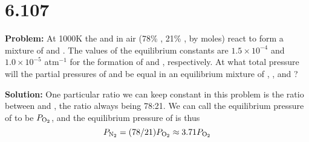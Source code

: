 \documentclass[11 pt]{article}
\newcommand{\p}[1]{
  P_{\ce{#1}}
}
\begin{document}
\section*{6.107}
\begin{problemBox}
  \textbf{Problem:} At 1000K the  and  in air (78\% , 21\% , by moles) react to form a mixture of  and .
  The values of the equilibrium constants are $1.5 \times 10^{-4}$ and $1.0 \times 10^{-5}$ atm$^{-1}$ for the formation of  and , respectively.
  At what total pressure will the partial pressures of  and  be equal in an equilibrium mixture of , ,  and ?
\end{problemBox}
\textbf{Solution:} One particular ratio we can keep constant in this problem is the ratio between  and , the ratio always being 78:21. We can call the equilibrium pressure of  to be $\p{O2}$, and the equilibrium pressure of  is thus 
 $$\p{N2} = (78/21)\p{O2} \approx 3.71\p{O2}$$
\end{document}
